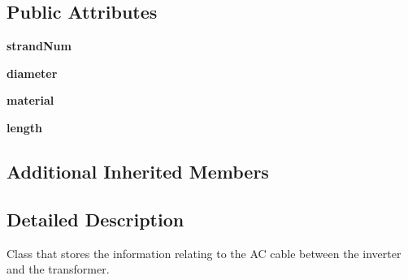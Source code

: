 \subsection*{Public Attributes}
\begin{DoxyCompactItemize}
\item 
\hypertarget{class_solar_calculator_1_1_assets_1_1_a_c1_cable_aee6a3856a5e0fe9db53979243bd3d150}{{\bfseries strand\-Num}}\label{class_solar_calculator_1_1_assets_1_1_a_c1_cable_aee6a3856a5e0fe9db53979243bd3d150}

\item 
\hypertarget{class_solar_calculator_1_1_assets_1_1_a_c1_cable_a898b5b127e21d31d6993bd726dee8004}{{\bfseries diameter}}\label{class_solar_calculator_1_1_assets_1_1_a_c1_cable_a898b5b127e21d31d6993bd726dee8004}

\item 
\hypertarget{class_solar_calculator_1_1_assets_1_1_a_c1_cable_a09818a90d48bfc585340af7b34a526c0}{{\bfseries material}}\label{class_solar_calculator_1_1_assets_1_1_a_c1_cable_a09818a90d48bfc585340af7b34a526c0}

\item 
\hypertarget{class_solar_calculator_1_1_assets_1_1_a_c1_cable_a793f2996ac4b29d9408d1da7616b8a16}{{\bfseries length}}\label{class_solar_calculator_1_1_assets_1_1_a_c1_cable_a793f2996ac4b29d9408d1da7616b8a16}

\end{DoxyCompactItemize}
\subsection*{Additional Inherited Members}


\subsection{Detailed Description}
\begin{DoxyVerb}Class that stores the information relating to the AC cable
between the inverter and the transformer. \end{DoxyVerb}
 

